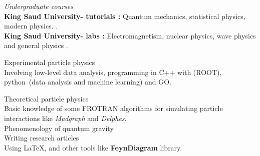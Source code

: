 \documentclass[11pt,article,oneside]{memoir}
\begin{document}
\bigskip





\bigskip 


 
 \bigskip



\bigskip 



\medskip


\vspace{-0.075in}

\normalsize

\bigskip
\noindent\emph{Undergraduate courses\vspace{0.05in}}\\
\ind \textbf{ King Saud University- tutorials :} Quantum mechanics, statistical physics, modern physics.    .\\
\ind \textbf{ King Saud University- labs :} Electromagnetism, nuclear physics, wave physics and general physics    .
\normalsize

\bigskip
\bigskip
{}

\ind Experimental particle physics \normalsize \vspace{0.05in}\\
Involving low-level data analysis, programming in C++ with (ROOT), python~(data analysis and  machine learning) and GO.
\normalsize

\bigskip
\ind Theoretical particle physics \normalsize \vspace{0.05in}\\
Basic knowledge of some FROTRAN algorithms for simulating particle interactions like  \textit{Madgraph} and \textit{Delphes}. \\
\ind Phenomenology of quantum gravity  \normalsize \vspace{0.05in}\\
\ind Writing research articles  \normalsize \vspace{0.05in}\\
Using \LaTeX, and other tools like \textbf{FeynDiagram} library.
\vspace{-0.075in}
\end{document}
